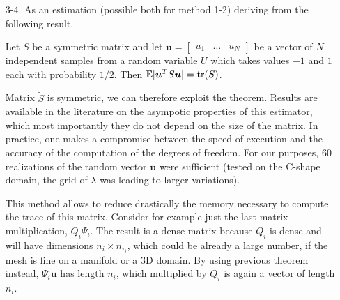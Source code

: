 \begin{enumerate}
	\item[3-4.] As an estimation (possible both for method 1-2) deriving from the following result.
		\begin{theorem}[Hutchinson]
			Let $S$ be a symmetric matrix and let $\bm{u} =
				\begin{bmatrix}
					u_1 & \dots & u_N
				\end{bmatrix}
			$ be a vector of $N$ independent samples from a random variable $U$
			which takes values $-1$ and $1$ each with probability $1/2$. Then
			$\mathbb{E}[\bm{u}^TS\bm{u}] = \operatorname*{tr} (S)$.
		\end{theorem}
		Matrix $\tilde{S}$ is symmetric, we can therefore exploit the theorem.
		Results are available in the literature on the asympotic properties of this
		estimator, which most importantly they do not depend on the size of the matrix.
		In practice, one makes a compromise between the speed of execution and the
		accuracy of the computation of the degrees of freedom. For our purposes, 60
		realizations of the random vector $\bm{u}$ were sufficient (tested on the
		C-shape domain, the grid of $\lambda$ was leading to larger variations).

		This method allows to reduce drastically the memory necessary to compute the
		trace of this matrix. Consider for example just the last matrix multiplication,
		$Q_i \Psi_i$. The result is a dense matrix because $Q_i$ is dense and will have
		dimensions $n_i \times n_{\tau_i}$, which could be already a large number, if
		the mesh is fine on a manifold or a 3D domain. By using previous theorem
		instead, $\Psi_i \bm{u}$ has length $n_i$, which multiplied by $Q_i$ is again a
		vector of length $n_i$.
\end{enumerate}
